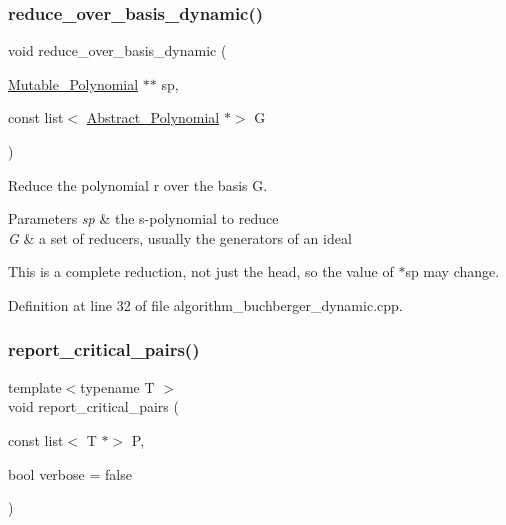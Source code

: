 \subsubsection{\texorpdfstring{reduce\+\_\+over\+\_\+basis\+\_\+dynamic()}{reduce\_over\_basis\_dynamic()}}
{\footnotesize\ttfamily void reduce\+\_\+over\+\_\+basis\+\_\+dynamic (\begin{DoxyParamCaption}\item[{\hyperlink{group__polygroup_class_mutable___polynomial}{Mutable\+\_\+\+Polynomial} $\ast$$\ast$}]{sp,  }\item[{const list$<$ \hyperlink{group__polygroup_class_abstract___polynomial}{Abstract\+\_\+\+Polynomial} $\ast$$>$}]{G }\end{DoxyParamCaption})}



Reduce the polynomial r over the basis G. 


\begin{DoxyParams}{Parameters}
{\em sp} & the s-\/polynomial to reduce \\
\hline
{\em G} & a set of reducers, usually the generators of an ideal\\
\hline
\end{DoxyParams}
This is a complete reduction, not just the head, so the value of $\ast$sp may change. 

Definition at line 32 of file algorithm\+\_\+buchberger\+\_\+dynamic.\+cpp.

\mbox{\label{group___g_b_computation_ga08267b9fbd6289d1eb28e019a11eba99}} 
\subsubsection{\texorpdfstring{report\+\_\+critical\+\_\+pairs()}{report\_critical\_pairs()}}
{\footnotesize\ttfamily template$<$typename T $>$ \\
void report\+\_\+critical\+\_\+pairs (\begin{DoxyParamCaption}\item[{const list$<$ T $\ast$$>$}]{P,  }\item[{bool}]{verbose = {\ttfamily false} }\end{DoxyParamCaption})}



